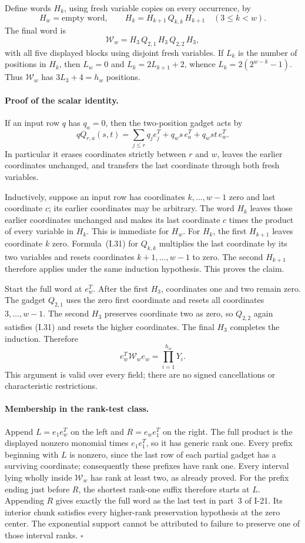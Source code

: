 Define words $H_k$, using fresh variable copies on every
occurrence, by
\[
 H_w=\text{empty word},\qquad
 H_k=H_{k+1}\,Q_{k,k}\,H_{k+1}
       \quad(3\le k<w).
\]
The final word is
\[
 \mathcal W_w=H_3\,Q_{2,1}\,H_3\,Q_{2,2}\,H_3,
\]
with all five displayed blocks using disjoint fresh variables.
If $L_k$ is the number of positions in $H_k$, then
$L_w=0$ and $L_k=2L_{k+1}+2$, whence
$L_k=2(2^{w-k}-1)$.  Thus $\mathcal W_w$ has
$3L_3+4=h_w$ positions.

\paragraph{Proof of the scalar identity.}
If an input row $q$ has $q_a=0$, then the two-position gadget
acts by
\[
 qQ_{r,a}(s,t)
   =\sum_{j\le r}q_je_j^T+q_ws\,e_a^T+q_wst\,e_w^T.
 \tag{I.31}
\]
In particular it erases coordinates strictly between $r$ and
$w$, leaves the earlier coordinates unchanged, and transfers
the last coordinate through both fresh variables.

Inductively, suppose an input row has coordinates
$k,\ldots,w-1$ zero and last coordinate $c$; its earlier
coordinates may be arbitrary.  The word $H_k$ leaves those
earlier coordinates unchanged and makes its last coordinate
$c$ times the product of every variable in $H_k$.
This is immediate for $H_w$.  For $H_k$, the first
$H_{k+1}$ leaves coordinate $k$ zero.  Formula~(I.31) for
$Q_{k,k}$ multiplies the last coordinate by its two variables
and resets coordinates $k+1,\ldots,w-1$ to zero.  The second
$H_{k+1}$ therefore applies under the same induction
hypothesis.  This proves the claim.

Start the full word at $e_w^T$.  After the first $H_3$,
coordinates one and two remain zero.  The gadget $Q_{2,1}$
uses the zero first coordinate and resets all coordinates
$3,\ldots,w-1$.  The second $H_3$ preserves coordinate two
as zero, so $Q_{2,2}$ again satisfies (I.31) and resets the
higher coordinates.  The final $H_3$ completes the induction.
Therefore
\[
 e_w^T\mathcal W_we_w=\prod_{i=1}^{h_w}Y_i.
\]
This argument is valid over every field; there are no signed
cancellations or characteristic restrictions.

\paragraph{Membership in the rank-test class.}
Append $L=e_1e_w^T$ on the left and $R=e_we_1^T$ on the
right.  The full product is the displayed nonzero monomial
times $e_1e_1^T$, so it has generic rank one.  Every prefix
beginning with $L$ is nonzero, since the last row of each
partial gadget has a surviving coordinate; consequently these
prefixes have rank one.  Every interval lying wholly inside
$\mathcal W_w$ has rank at least two, as already proved.
For the prefix ending just before $R$, the shortest rank-one
suffix therefore starts at $L$.  Appending $R$ gives exactly
the full word as the last test in part~3 of I-21.
Its interior chunk satisfies every higher-rank preservation
hypothesis at the zero center.  The exponential support cannot
be attributed to failure to preserve one of those interval
ranks. \hfill$\square$


